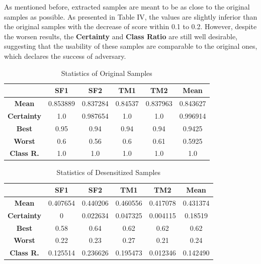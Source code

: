 \documentclass[journal]{IEEEtran} %
\begin{document}
\begin{CJK*}{UTF8}{gbsn}
As mentioned before, extracted samples are meant to be as close to the original samples as possible. As presented in Table IV, the values are slightly inferior than the original samples with the decrease of score within 0.1 to 0.2. However, despite the worsen results, the \textbf{Certainty} and \textbf{Class Ratio} are still well desirable, suggesting that the usability of these samples are comparable to the original ones, which declares the success of adversary.

\begin{table}[htbp]
    \centering
    \caption{Statistics of Original Samples}
    \begin{tabular}{|c|c|c|c|c|c|}
        \hline
        & \textbf{SF1} & \textbf{SF2} & \textbf{TM1} & \textbf{TM2} & \textbf{Mean} \\
        \hline
        \textbf{Mean} & 0.853889 & 0.837284 & 0.84537 & 0.837963 & 0.843627 \\
        \hline
        \textbf{Certainty} & 1.0 & 0.987654 & 1.0 & 1.0 & 0.996914 \\
        \hline
        \textbf{Best} & 0.95 & 0.94 & 0.94 & 0.94 & 0.9425\\
        \hline
        \textbf{Worst} & 0.6 & 0.56 & 0.6 & 0.61 & 0.5925\\
        \hline
        \textbf{Class R.} & 1.0 & 1.0 & 1.0 & 1.0 & 1.0\\
        \hline
    \end{tabular}
    \label{tab:st_org}
\end{table}

\begin{table}[htbp]
    \centering
    \caption{Statistics of Desensitized Samples}
    \begin{tabular}{|c|c|c|c|c|c|}
        \hline
        & \textbf{SF1} & \textbf{SF2} & \textbf{TM1} & \textbf{TM2} & \textbf{Mean} \\
        \hline
        \textbf{Mean} & 0.407654 & 0.440206 & 0.460556 & 0.417078 & 0.431374 \\
        \hline
        \textbf{Certainty} & 0 & 0.022634 & 0.047325 & 0.004115 & 0.18519 \\
        \hline
        \textbf{Best} & 0.58 & 0.64 & 0.62 & 0.62 & 0.62 \\
        \hline
        \textbf{Worst} & 0.22 & 0.23 & 0.27 & 0.21 & 0.24 \\
        \hline
        \textbf{Class R.} & 0.125514 & 0.236626 & 0.195473 & 0.012346 & 0.142490 \\
        \hline
    \end{tabular}
    \label{tab:st_des}
\end{table}


\end{CJK*}
\end{document}
